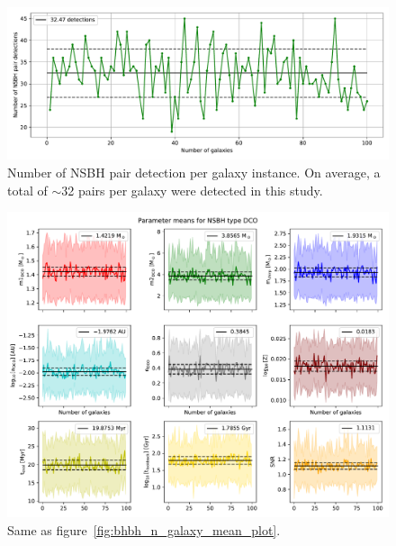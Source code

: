 \begin{figure}[!h]
	\centering
	\includegraphics[width=\columnwidth]{analysis_data/main_analysis_folder/NSBH_n_detections}
	\caption{Number of NSBH pair detection per galaxy instance. On average, a total of $\sim$32 pairs per galaxy were detected in this study.}
	\label{fig:nsbhndetections}
\end{figure}	

\begin{figure}[!h]
	\centering
	\includegraphics[width=\columnwidth]{analysis_data/main_analysis_folder/NSBH_n_galaxy_mean_plot}
	\caption{Same as figure~\ref{fig:bhbh_n_galaxy_mean_plot}.}
	\label{fig:nsbh_n_galaxy_mean_plot}
\end{figure}

\newpage
